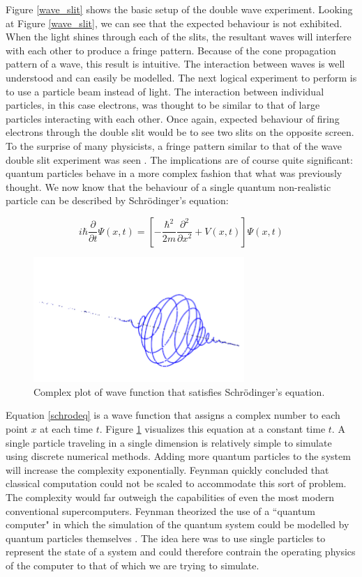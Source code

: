 \documentclass[conference]{IEEEtran}
\begin{document}
Figure \ref{wave_slit} shows the basic setup of the double wave experiment. Looking at Figure \ref{wave_slit}, we can see that the expected behaviour is not exhibited. When the light shines through each of the slits, the resultant waves will interfere with each other to produce a fringe pattern. Because of the cone propagation pattern of a wave, this result is intuitive. The interaction between waves is well understood and can easily be modelled. The next logical experiment to perform is to use a particle beam instead of light. The interaction between individual particles, in this case electrons, was thought to be similar to that of large particles interacting with each other. Once again, expected behaviour of firing electrons through the double slit would be to see two slits on the opposite screen. To the surprise of many physicists, a fringe pattern similar to that of the wave double slit experiment was seen \cite{b4}. The implications are of course quite significant: quantum particles behave in a more complex fashion that what was previously thought. We now know that the behaviour of a single quantum non-realistic particle can be described by Schr\"{o}dinger's equation:

\begin{equation}
i\hbar {\frac {\partial }{\partial t}}\Psi (x,t)=\left[-{\frac {\hbar ^{2}}{2m}}{\frac {\partial ^{2}}{\partial x^{2}}}+V(x,t)\right]\Psi (x,t)
\label{schrodeq}
\end{equation}

\begin{figure}[htbp]
\centerline{\includegraphics[width=8cm]{schrodinger}}
\caption{Complex plot of wave function that satisfies Schr\"{o}dinger's equation.}
\label{schrod}
\end{figure}

Equation \ref{schrodeq} is a wave function that assigns a complex number to each point $x$ at each time $t$. Figure \ref{schrod} visualizes this equation at a constant time $t$. A single particle traveling in a single dimension is relatively simple to simulate using discrete numerical methods. Adding more quantum particles to the system will increase the complexity exponentially. Feynman quickly concluded that classical computation could not be scaled to accommodate this sort of problem. The complexity would far outweigh the capabilities of even the most modern conventional supercomputers. Feynman theorized the use of a ``quantum computer" in which the simulation of the quantum system could be modelled by quantum particles themselves \cite{b4}. The idea here was to use single particles to represent the state of a system and could therefore contrain the operating physics of the computer to that of which we are trying to simulate.
\end{document}
